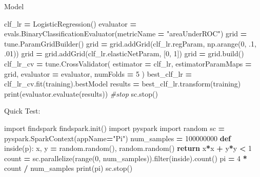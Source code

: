 \documentclass[]{book}
\newenvironment{Shaded}{\begin{snugshade}}{\end{snugshade}}
\newcommand{\KeywordTok}[1]{\textcolor[rgb]{0.13,0.29,0.53}{\textbf{#1}}}
\newcommand{\DecValTok}[1]{\textcolor[rgb]{0.00,0.00,0.81}{#1}}
\newcommand{\StringTok}[1]{\textcolor[rgb]{0.31,0.60,0.02}{#1}}
\newcommand{\ImportTok}[1]{#1}
\newcommand{\CommentTok}[1]{\textcolor[rgb]{0.56,0.35,0.01}{\textit{#1}}}
\newcommand{\ControlFlowTok}[1]{\textcolor[rgb]{0.13,0.29,0.53}{\textbf{#1}}}
\newcommand{\OperatorTok}[1]{\textcolor[rgb]{0.81,0.36,0.00}{\textbf{#1}}}
\newcommand{\BuiltInTok}[1]{#1}
\newcommand{\NormalTok}[1]{#1}
\theoremstyle{definition}
\theoremstyle{definition}
\theoremstyle{definition}
\theoremstyle{remark}
\begin{document}
Model

\begin{Shaded}
\begin{Highlighting}[]
\NormalTok{clf_lr }\OperatorTok{=}\NormalTok{ LogisticRegression()}
\NormalTok{evaluator }\OperatorTok{=}\NormalTok{ evals.BinaryClassificationEvaluator(metricName }\OperatorTok{=} \StringTok{"areaUnderROC"}\NormalTok{)}
\NormalTok{grid }\OperatorTok{=}\NormalTok{ tune.ParamGridBuilder()}
\NormalTok{grid }\OperatorTok{=}\NormalTok{ grid.addGrid(clf_lr.regParam, np.arange(}\DecValTok{0}\NormalTok{, .}\DecValTok{1}\NormalTok{, .}\DecValTok{01}\NormalTok{))}
\NormalTok{grid }\OperatorTok{=}\NormalTok{ grid.addGrid(clf_lr.elasticNetParam, [}\DecValTok{0}\NormalTok{, }\DecValTok{1}\NormalTok{])}
\NormalTok{grid }\OperatorTok{=}\NormalTok{ grid.build()}
\NormalTok{clf_lr_cv }\OperatorTok{=}\NormalTok{ tune.CrossValidator(}
\NormalTok{    estimator }\OperatorTok{=}\NormalTok{ clf_lr,}
\NormalTok{    estimatorParamMaps }\OperatorTok{=}\NormalTok{ grid,}
\NormalTok{    evaluator }\OperatorTok{=}\NormalTok{ evaluator,}
\NormalTok{    numFolds }\OperatorTok{=} \DecValTok{5}
\NormalTok{               )}
\NormalTok{best_clf_lr }\OperatorTok{=}\NormalTok{ clf_lr_cv.fit(training).bestModel}
\NormalTok{results }\OperatorTok{=}\NormalTok{ best_clf_lr.transform(training)}
\BuiltInTok{print}\NormalTok{(evaluator.evaluate(results))}
\CommentTok{#stop}
\NormalTok{sc.stop()}
\end{Highlighting}
\end{Shaded}

Quick Test:

\begin{Shaded}
\begin{Highlighting}[]
\ImportTok{import}\NormalTok{ findspark}
\NormalTok{findspark.init()}
\ImportTok{import}\NormalTok{ pyspark}
\ImportTok{import}\NormalTok{ random}
\NormalTok{sc }\OperatorTok{=}\NormalTok{ pyspark.SparkContext(appName}\OperatorTok{=}\StringTok{"Pi"}\NormalTok{)}
\NormalTok{num_samples }\OperatorTok{=} \DecValTok{100000000}
\KeywordTok{def}\NormalTok{ inside(p):     }
\NormalTok{    x, y }\OperatorTok{=}\NormalTok{ random.random(), random.random()}
    \ControlFlowTok{return}\NormalTok{ x}\OperatorTok{*}\NormalTok{x }\OperatorTok{+}\NormalTok{ y}\OperatorTok{*}\NormalTok{y }\OperatorTok{<} \DecValTok{1}
\NormalTok{count }\OperatorTok{=}\NormalTok{ sc.parallelize(}\BuiltInTok{range}\NormalTok{(}\DecValTok{0}\NormalTok{, num_samples)).}\BuiltInTok{filter}\NormalTok{(inside).count()}
\NormalTok{pi }\OperatorTok{=} \DecValTok{4} \OperatorTok{*}\NormalTok{ count }\OperatorTok{/}\NormalTok{ num_samples}
\BuiltInTok{print}\NormalTok{(pi)}
\NormalTok{sc.stop()}
\end{Highlighting}
\end{Shaded}
\end{document}
